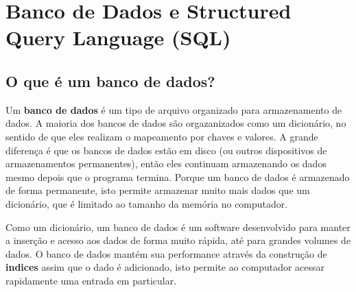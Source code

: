 
\chapter{Banco de Dados e Structured Query Language (SQL)}

\section{O que é um banco de dados?}


Um {\bf banco de dados} é um tipo de arquivo organizado para armazenamento de
dados. A maioria dos bancos de dados são orgazanizados como um dicionário, no
sentido de que eles realizam o mapeamento por chaves e valores. A grande
diferença é que os bancos de dados estão em disco (ou outros dispositivos de
armazenamentos permanentes), então eles continuam armazenando os dados mesmo
depois que o programa termina. Porque um banco de dados é armazenado de forma
permanente, isto permite armazenar muito mais dados que um dicionário, que é
limitado ao tamanho da memória no computador.


Como um dicionário, um banco de dados é um software desenvolvido para manter a
inserção e acesso aos dados de forma muito rápida, até para grandes volumes de
dados. O banco de dados mantém sua performance através da construção de
{\bf indices} assim que o dado é adicionado, isto permite ao computador acessar
rapidamente uma entrada em particular.

